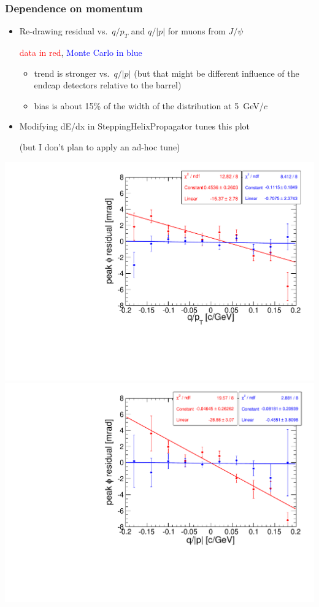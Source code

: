 \documentclass[compress]{beamer}
\begin{document}
\begin{frame}
\frametitle{Dependence on momentum}
\begin{itemize}
\item Re-drawing residual vs.\ $q/p_T$ and $q/|p|$ for muons from $J/\psi$

\textcolor{red}{data in red}, \textcolor{blue}{Monte Carlo in blue}

\begin{itemize}\setlength{\itemsep}{0.1 cm}
\item trend is stronger vs.\ $q/|p|$ (but that might be different
  influence of the endcap detectors relative to the barrel)

\item bias is about 15\% of the width of the distribution at 5~GeV/$c$
\end{itemize}

\item Modifying dE/dx in SteppingHelixPropagator tunes this plot

(but I don't plan to apply an ad-hoc tune)
\end{itemize}

\vfill
\includegraphics[width=0.49\linewidth]{datamc_jpsicut_qoverpt.pdf}
\includegraphics[width=0.49\linewidth]{datamc_jpsicut_qoverpmag.pdf}
\end{frame}
\end{document}
